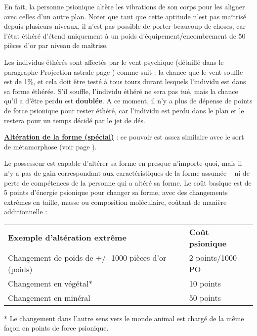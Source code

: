 En fait, la personne psionique altère les vibrations de son corps pour les aligner avec celles d'un autre plan. Noter que tant que cette aptitude n'est pas maîtrisé depuis plusieurs niveaux, il n'est pas possible de porter beaucoup de choses, car l'état éthéré d'étend uniquement à un poids d'équipement/encombrement de 50 pièces d'or par niveau de maîtrise.

\bigskip

Les individus éthérés sont affectés par le vent psychique (détaillé dans le paragraphe Projection astrale page \pageref{guerrier-projection-astrale}) comme suit : la chance que le vent souffle est de 1\%, et cela doit être testé à tous tours durant lesquels l'individu est dans sa forme éthérée. S'il souffle, l'individu éthéré ne sera pas tué, mais la chance qu'il a d'être perdu est \textbf{doublée}. A ce moment, il n'y a plus de dépense de points de force psionique pour rester éthéré, car l'individu est perdu dans le plan et le restera pour un temps décidé par le jet de dés.

\bigskip

\label{magicien-alteration-forme}\textbf{\uline{Altération de la forme (spécial)}} : ce pouvoir est assez similaire avec le sort de métamorphose (voir page \pageref{sort-metamorphose}).

\bigskip

Le possesseur est capable d'altérer sa forme en presque n'importe quoi, mais il n'y a pas de gain correspondant aux caractéristiques de la forme assumée -- ni de perte de compétences de la personne qui a altéré sa forme. Le coût basique est de 5 points d'énergie psionique pour changer sa forme, avec des changements extrêmes en taille, masse ou composition moléculaire, coûtant de manière additionnelle :

\bigskip

\begin{tabular}{ll}
\textbf{Exemple d'altération extrême} & \textbf{Coût psionique} \\
Changement de poids de +/- 1000 pièces d'or (poids) & 2 points/1000 PO \\
Changement en végétal* & 10 points \\
Changement en minéral & 50 points \\
\end{tabular}

\bigskip

* Le changement dans l'autre sens vers le monde animal est chargé de la même façon en points de force psionique.



